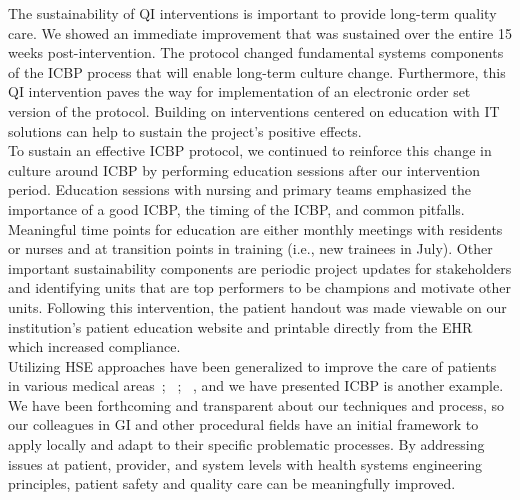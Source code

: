 \documentclass[Bprep]{subfiles}
\begin{document}
The sustainability of QI interventions is important to provide long-term quality care. We showed an immediate improvement that was sustained over the entire 15 weeks post-intervention. The protocol changed fundamental systems components of the ICBP process that will enable long-term culture change. Furthermore, this QI intervention paves the way for implementation of an electronic order set version of the protocol. Building on interventions centered on education with IT solutions can help to sustain the project's positive effects.\\

To sustain an effective ICBP protocol, we continued to reinforce this change in culture around ICBP by performing education sessions after our intervention period. Education sessions with nursing and primary teams emphasized the importance of a good ICBP, the timing of the ICBP, and common pitfalls. Meaningful time points for education are either monthly meetings with residents or nurses and at transition points in training (i.e., new trainees in July). Other important sustainability components are periodic project updates for stakeholders and identifying units that are top performers
to be champions and motivate other units. Following this intervention, the patient handout was made viewable on our institution's patient education website and printable directly from the EHR which increased compliance.\\

Utilizing HSE approaches have been generalized to improve the care of patients in various medical areas~\cite{Watts2013-xv}; ~\cite{Das2018-jo}; ~\cite{Silva2010-so}, and we have presented ICBP is another example. We have been forthcoming and transparent about our techniques and process, so our colleagues in GI and other procedural fields have an initial framework to apply locally and adapt to their specific problematic processes. By addressing issues at patient, provider, and system levels with health systems engineering principles, patient safety and quality care can be meaningfully improved.

\end{document}
